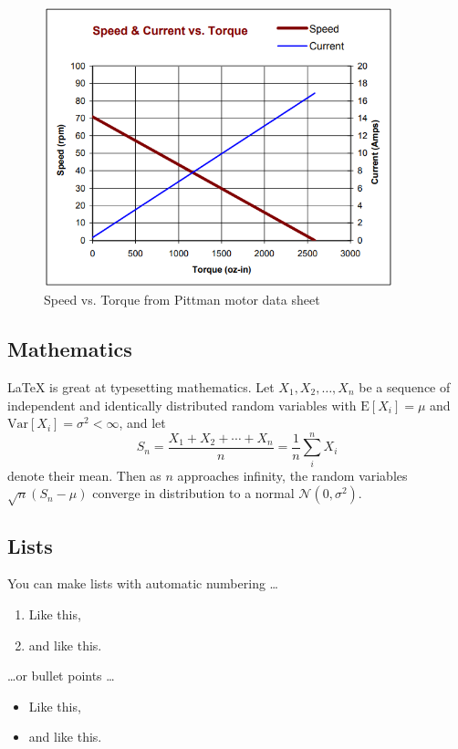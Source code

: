 \begin{figure}[hbt!]
    \centering
    \includegraphics[width=0.9\textwidth]{Images/SpeedvsTorque.png}
    \caption{Speed vs. Torque from Pittman motor data sheet}
    \label{fig:Speed vs. Torque from Pittman}
\end{figure}





\subsection{Mathematics}

\LaTeX{} is great at typesetting mathematics. Let $X_1, X_2, \ldots, X_n$ be a sequence of independent and identically distributed random variables with $\text{E}[X_i] = \mu$ and $\text{Var}[X_i] = \sigma^2 < \infty$, and let
$$S_n = \frac{X_1 + X_2 + \cdots + X_n}{n}
      = \frac{1}{n}\sum_{i}^{n} X_i$$
denote their mean. Then as $n$ approaches infinity, the random variables $\sqrt{n}(S_n - \mu)$ converge in distribution to a normal $\mathcal{N}(0, \sigma^2)$.

\subsection{Lists}

You can make lists with automatic numbering \dots

\begin{enumerate}
\item Like this,
\item and like this.
\end{enumerate}
\dots or bullet points \dots
\begin{itemize}
\item Like this,
\item and like this.
\end{itemize}

